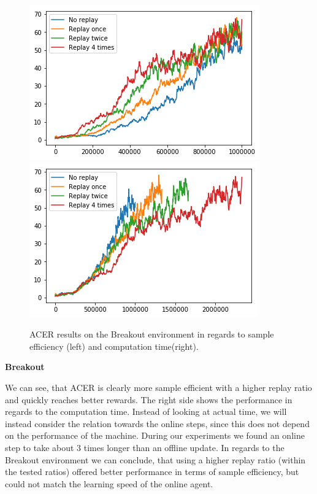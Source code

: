 \begin{figure}[h]
\includegraphics[scale=0.5]{bilder/breakoutbyonline.png}
\includegraphics[scale=0.5]{bilder/breakoutbytime.png}
\caption{ACER results on the Breakout environment in regards to sample efficiency (left) and computation time(right).}
\end{figure}
\textbf{Breakout}

We can see, that ACER is clearly more sample efficient with a higher replay ratio and quickly reaches better rewards. 
The right side shows the performance in regards to the computation time. Instead of looking at actual time, we will instead consider the relation towards the online steps, since this does not depend on the performance of the machine. During our experiments we found an online step to take about 3 times longer than an offline update.
In regards to the Breakout environment we can conclude, that using a higher replay ratio (within the tested ratios) offered better performance in terms of sample efficiency, but could not match the learning speed of the online agent.


